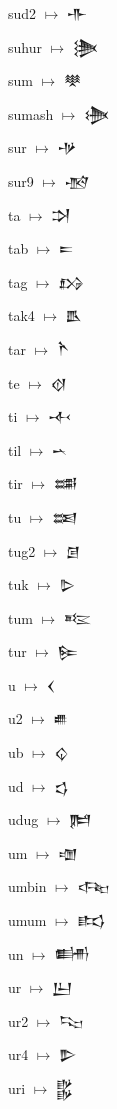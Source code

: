 {\noindent sud2 $\mapsto$ {\cufont 𒋥}\par
\noindent suhur $\mapsto$ {\cufont 𒋦}\par
\noindent sum $\mapsto$ {\cufont 𒋧}\par
\noindent sumash $\mapsto$ {\cufont 𒋨}\par
\noindent sur $\mapsto$ {\cufont 𒋩}\par
\noindent sur9 $\mapsto$ {\cufont 𒋪}\par
\noindent ta $\mapsto$ {\cufont 𒋫}\par
\noindent tab $\mapsto$ {\cufont 𒋰}\par
\noindent tag $\mapsto$ {\cufont 𒋳}\par
\noindent tak4 $\mapsto$ {\cufont 𒋺}\par
\noindent tar $\mapsto$ {\cufont 𒋻}\par
\noindent te $\mapsto$ {\cufont 𒋼}\par
\noindent ti $\mapsto$ {\cufont 𒋾}\par
\noindent til $\mapsto$ {\cufont 𒌀}\par
\noindent tir $\mapsto$ {\cufont 𒌁}\par
\noindent tu $\mapsto$ {\cufont 𒌅}\par
\noindent tug2 $\mapsto$ {\cufont 𒌆}\par
\noindent tuk $\mapsto$ {\cufont 𒌇}\par
\noindent tum $\mapsto$ {\cufont 𒌈}\par
\noindent tur $\mapsto$ {\cufont 𒌉}\par
\noindent u $\mapsto$ {\cufont 𒌋}\par
\noindent u2 $\mapsto$ {\cufont 𒌑}\par
\noindent ub $\mapsto$ {\cufont 𒌒}\par
\noindent ud $\mapsto$ {\cufont 𒌓}\par
\noindent udug $\mapsto$ {\cufont 𒌜}\par
\noindent um $\mapsto$ {\cufont 𒌝}\par
\noindent umbin $\mapsto$ {\cufont 𒌢}\par
\noindent umum $\mapsto$ {\cufont 𒌣}\par
\noindent un $\mapsto$ {\cufont 𒌦}\par
\noindent ur $\mapsto$ {\cufont 𒌨}\par
\noindent ur2 $\mapsto$ {\cufont 𒌫}\par
\noindent ur4 $\mapsto$ {\cufont 𒌴}\par
\noindent uri $\mapsto$ {\cufont 𒌵}\par
}
